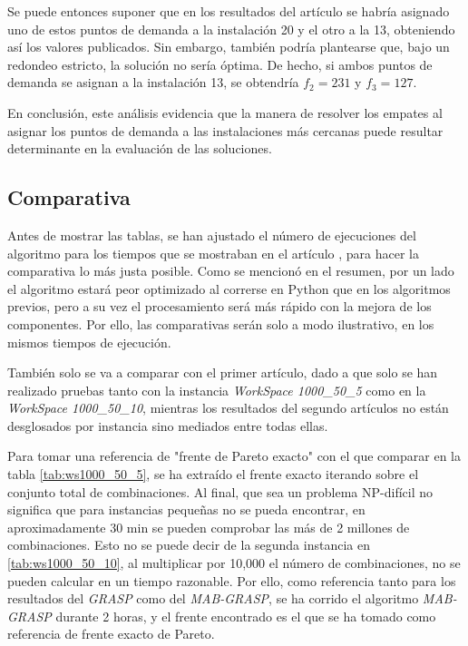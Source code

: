 \documentclass[12pt,a4paper]{book}
\begin{document}
Se puede entonces suponer que en los resultados del artículo se habría asignado uno de estos puntos de demanda a la instalación 20 y el otro a la 13, obteniendo así los valores publicados. Sin embargo, también podría plantearse que, bajo un redondeo estricto, la solución no sería óptima.
De hecho, si ambos puntos de demanda se asignan a la instalación 13, se obtendría $f_2 = 231$ y $f_3 = 127$.

En conclusión, este análisis evidencia que la manera de resolver los empates al asignar los puntos de demanda a las instalaciones más cercanas puede resultar determinante en la evaluación de las soluciones.

\subsection{Comparativa}

Antes de mostrar las tablas, se han ajustado el número de ejecuciones del algoritmo para los tiempos que se mostraban en el artículo \cite{k-balanced_1}, para hacer la comparativa lo más justa posible. Como se mencionó en el resumen, por un lado el algoritmo estará peor optimizado al correrse en 
Python que en los algoritmos previos, pero a su vez el procesamiento será más rápido con la mejora de los componentes. Por ello, las comparativas serán solo a modo ilustrativo, en los mismos tiempos de ejecución.

También solo se va a comparar con el primer artículo, dado a que solo se han realizado pruebas tanto con la instancia \textit{WorkSpace 1000\_50\_5} como en la \textit{WorkSpace 1000\_50\_10}, mientras los resultados del segundo artículos no están desglosados 
por instancia sino mediados entre todas ellas.

Para tomar una referencia de "frente de Pareto exacto" con el que comparar en la tabla \ref{tab:ws1000_50_5}, se ha extraído el frente exacto iterando sobre el conjunto total de combinaciones.
Al final, que sea un problema NP-difícil no significa que para instancias pequeñas no se pueda encontrar, en aproximadamente 30 min se pueden comprobar las más de 2 millones de combinaciones. Esto
no se puede decir de la segunda instancia en \ref{tab:ws1000_50_10}, al multiplicar por 10,000 el número de combinaciones, no se pueden calcular en un tiempo razonable. Por ello, como referencia tanto para los resultados del \textit{GRASP} como del \textit{MAB-GRASP},
se ha corrido el algoritmo \textit{MAB-GRASP} durante 2 horas, y el frente encontrado es el que se ha tomado como referencia de frente exacto de Pareto.
\end{document}
